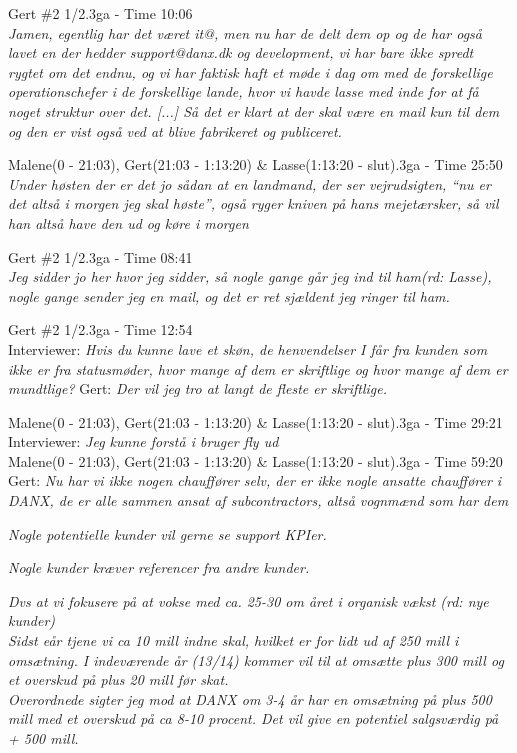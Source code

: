 \begin{thebibliography}{9}
	Gert \#2 1/2.3ga - Time 10:06\\
	\textit{Jamen, egentlig har det været it@, men nu har de delt dem op og de har også lavet en der hedder support@danx.dk og development, vi har bare ikke spredt rygtet om det endnu, og vi har faktisk haft et møde i dag om med de forskellige operationschefer i de forskellige lande, hvor vi havde lasse med inde for at få noget struktur over det. [...] Så det er klart at der skal være en mail kun til dem og den er vist også ved at blive fabrikeret og publiceret. }

	Malene(0 - 21:03), Gert(21:03 - 1:13:20) \& Lasse(1:13:20 - slut).3ga - Time 25:50\\
	\textit{Under høsten der er det jo sådan at en landmand, der ser vejrudsigten, “nu er det altså i morgen jeg skal høste”, også ryger kniven på hans mejetærsker, så vil han altså have den ud og køre i morgen}

	Gert \#2 1/2.3ga - Time 08:41\\
	\textit{Jeg sidder jo her hvor jeg sidder, så nogle gange går jeg ind til ham\emph{(rd: Lasse)}, nogle gange sender jeg en mail, og det er ret sjældent jeg ringer til ham.}

	Gert \#2 1/2.3ga - Time 12:54\\
	Interviewer: \textit{Hvis du kunne lave et skøn, de henvendelser I får fra kunden som ikke er fra statusmøder, hvor mange af dem er skriftlige og hvor mange af dem er mundtlige?} Gert: \textit{Der vil jeg tro at langt de fleste er skriftlige.}

	Malene(0 - 21:03), Gert(21:03 - 1:13:20) \& Lasse(1:13:20 - slut).3ga - Time 29:21\\
	Interviewer: \textit{Jeg kunne forstå i bruger fly ud}\\

	Malene(0 - 21:03), Gert(21:03 - 1:13:20) \& Lasse(1:13:20 - slut).3ga - Time 59:20\\
	Gert: \textit{Nu har vi ikke nogen chauffører selv, der er ikke nogle ansatte chauffører i DANX, de er alle sammen ansat af subcontractors, altså vognmænd som har dem}

	\textit{Nogle potentielle kunder vil gerne se support KPIer.}

	\textit{Nogle kunder kræver referencer fra andre kunder.}

	\textit{Dvs at vi fokusere på at vokse med ca. 25-30 om året i organisk vækst \emph{(rd: nye kunder)}}\\
\textit{Sidst eår tjene vi ca 10 mill indne skal, hvilket er for lidt ud af 250 mill i omsætning. I indeværende år (13/14) kommer vil til at omsætte plus 300 mill og et overskud på plus 20 mill før skat.}\\
\textit{Overordnede sigter jeg mod at DANX om 3-4 år har en omsætning på plus 500 mill med et overskud på ca 8-10 procent. Det vil give en potentiel salgsværdig på + 500 mill.}


\end{thebibliography}
